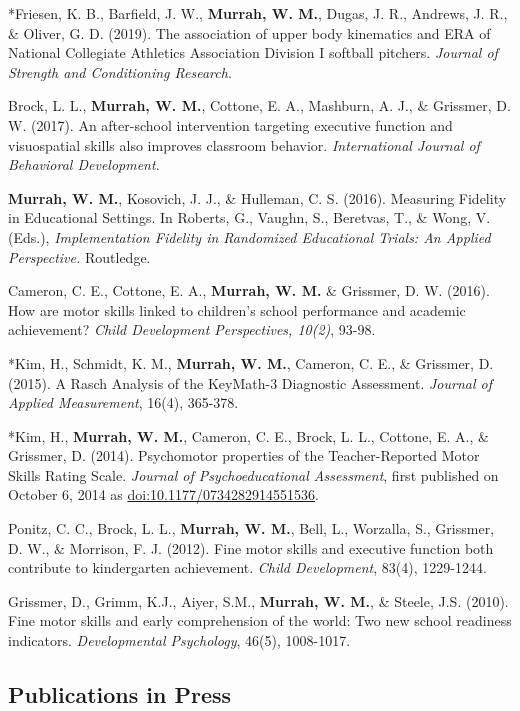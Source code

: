 \documentclass[11pt,]{article}
\begin{document}
*Friesen, K. B., Barfield, J. W., \textbf{Murrah, W. M.}, Dugas, J. R.,
Andrews, J. R., \& Oliver, G. D. (2019). The association of upper body
kinematics and ERA of National Collegiate Athletics Association Division
I softball pitchers. \emph{Journal of Strength and Conditioning
Research}.

Brock, L. L., \textbf{Murrah, W. M.}, Cottone, E. A., Mashburn, A. J.,
\& Grissmer, D. W. (2017). An after-school intervention targeting
executive function and visuospatial skills also improves classroom
behavior. \emph{International Journal of Behavioral Development}.

\textbf{Murrah, W. M.}, Kosovich, J. J., \& Hulleman, C. S. (2016).
Measuring Fidelity in Educational Settings. In Roberts, G., Vaughn, S.,
Beretvas, T., \& Wong, V. (Eds.), \emph{Implementation Fidelity in
Randomized Educational Trials: An Applied Perspective.} Routledge.

Cameron, C. E., Cottone, E. A., \textbf{Murrah, W. M.} \& Grissmer, D.
W. (2016). How are motor skills linked to children's school performance
and academic achievement? \emph{Child Development Perspectives, 10(2)},
93-98.

*Kim, H., Schmidt, K. M., \textbf{Murrah, W. M.}, Cameron, C. E., \&
Grissmer, D. (2015). A Rasch Analysis of the KeyMath-3 Diagnostic
Assessment. \emph{Journal of Applied Measurement}, 16(4), 365-378.

*Kim, H., \textbf{Murrah, W. M.}, Cameron, C. E., Brock, L. L., Cottone,
E. A., \& Grissmer, D. (2014). Psychomotor properties of the
Teacher-Reported Motor Skills Rating Scale. \emph{Journal of
Psychoeducational Assessment}, first published on October 6, 2014 as
\url{doi:10.1177/0734282914551536}.

Ponitz, C. C., Brock, L. L., \textbf{Murrah, W. M.}, Bell, L., Worzalla,
S., Grissmer, D. W., \& Morrison, F. J. (2012). Fine motor skills and
executive function both contribute to kindergarten achievement.
\emph{Child Development}, 83(4), 1229-1244.

Grissmer, D., Grimm, K.J., Aiyer, S.M., \textbf{Murrah, W. M.}, \&
Steele, J.S. (2010). Fine motor skills and early comprehension of the
world: Two new school readiness indicators. \emph{Developmental
Psychology}, 46(5), 1008-1017.

\hypertarget{publications-in-press}{%
\subsection{Publications in Press}\label{publications-in-press}}
\end{document}
